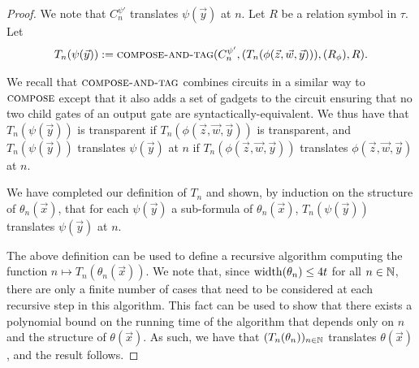 \documentclass[../paper.tex]{subfiles}
\begin{document}
\begin{proof}
  We note that $C^{\psi'}_n$ translates $\psi (\vec{y})$ at $n$. Let $R$ be a
  relation symbol in $\tau$. Let
  \begin{align*} T_n(\psi(\vec{y})) := {\normalfont\textsc{compose-and-tag}}(C^{\psi'}_n,
    (T_n(\phi(\vec{z}, \vec{w}, \vec{y}))), (R_\phi), R).
  \end{align*}

  We recall that ${\normalfont\textsc{compose-and-tag}}$ combines circuits in a similar way to
  ${\normalfont\textsc{compose}}$ except that it also adds a set of gadgets to the circuit
  ensuring that no two child gates of an output gate are
  syntactically-equivalent. We thus have that $T_n(\psi (\vec{y}))$ is
  transparent if $T_n(\phi (\vec{z}, \vec{w},\vec{y}))$ is transparent, and
  $T_n(\psi(\vec{y}))$ translates $\psi (\vec{y})$ at $n$ if $T_n(\phi (\vec{z},
  \vec{w},\vec{y}))$ translates $\phi(\vec{z}, \vec{w}, \vec{y})$ at $n$.

  We have completed our definition of $T_n$ and shown, by induction on the
  structure of $\theta_n(\vec{x})$, that for each $\psi (\vec{y})$ a sub-formula
  of $\theta_n(\vec{x})$, $T_n(\psi(\vec{y}))$ translates $\psi(\vec{y})$ at
  $n$.

  The above definition can be used to define a recursive algorithm computing the
  function $n \mapsto T_n (\theta_n(\vec{x}))$. We note that, since
  $\mathrm{width}(\theta_n) \leq 4 t$ for all $n \in \mathbb{N}$, there are only a finite
  number of cases that need to be considered at each recursive step in this
  algorithm. This fact can be used to show that there exists a polynomial bound
  on the running time of the algorithm that depends only on $n$ and the
  structure of $\theta(\vec{x})$. As such, we have that $(T_n (\theta_n))_{n \in
    \mathbb{N}}$ translates $\theta(\vec{x})$, and the result follows.
  
  

\end{proof}
\end{document}
